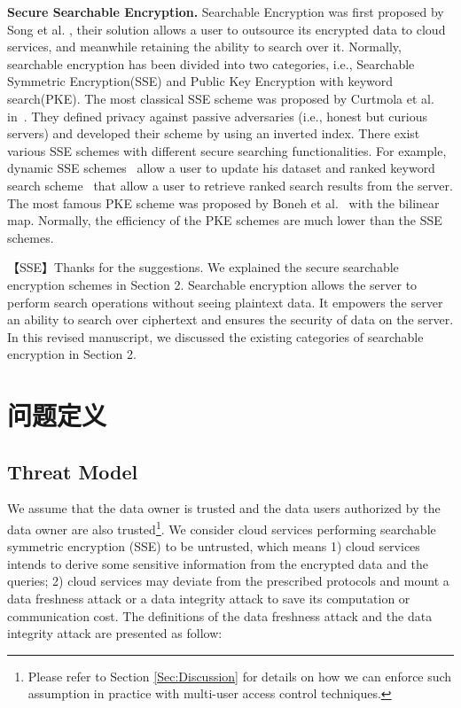 \noindent\textbf{Secure Searchable Encryption.} Searchable Encryption was first proposed by Song et al. \cite{song2000practical}, their solution allows a user to outsource its encrypted data to cloud services, and meanwhile retaining the ability to search over it. Normally, searchable encryption has been divided into two categories, i.e.,  Searchable Symmetric Encryption(SSE) and Public Key Encryption with keyword search(PKE). The most classical SSE scheme was proposed by Curtmola et al. in~\cite{curtmola2011searchable}. They defined  privacy against passive adversaries (i.e., honest but curious servers) and developed their scheme by using an inverted index. There exist various SSE schemes with different secure searching functionalities. For example, dynamic SSE schemes~\cite{kamara2012dynamic,cash2014dynamic,stefanov2014practical} allow a user to update his dataset and ranked keyword search scheme~\cite{wang2010secure} that allow a user to retrieve  ranked search results from the server. The most famous PKE scheme was proposed by Boneh et al.~\cite{boneh2004public} with the bilinear map. Normally, the efficiency of the PKE schemes are much lower than the SSE schemes.

【SSE】Thanks for the suggestions. We explained the secure searchable encryption schemes in Section 2. Searchable encryption allows the server to perform search operations without seeing plaintext data. It empowers the server an ability to search over ciphertext and ensures the security of data on the server. In this revised manuscript, we discussed the existing categories of searchable encryption in Section 2.

\section{问题定义}


\subsection{Threat Model}
We assume that the data owner is trusted and the data users authorized by the data owner are also trusted\footnote{Please refer to Section \ref{Sec:Discussion} for details on how we can enforce such assumption in practice with multi-user access control techniques.}.
We consider cloud services performing searchable symmetric encryption (SSE) to be untrusted, which means 1) cloud services intends to derive some sensitive information from the encrypted data and the queries; 2) cloud services may deviate from the prescribed protocols and mount a data freshness attack or a data integrity attack to save its computation or communication cost. The definitions of the data freshness attack and the data integrity attack are presented as follow:

